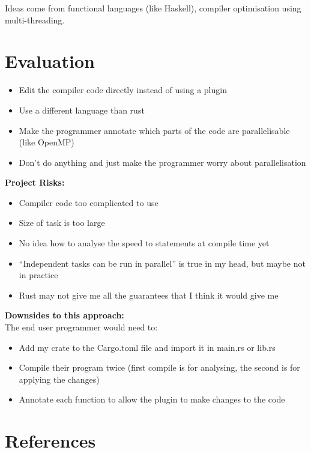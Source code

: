 \documentclass[12pt, a4paper]{article}
\begin{document}
Ideas come from functional languages (like Haskell), compiler optimisation using multi-threading.

\section{Evaluation}
\begin{itemize}
	\item Edit the compiler code directly instead of using a plugin
	\item Use a different language than rust
	\item Make the programmer annotate which parts of the code are parallelisable (like OpenMP)
	\item Don't do anything and just make the programmer worry about parallelisation
\end{itemize}

\textbf{Project Risks:}
\begin{itemize}
	\item Compiler code too complicated to use
	\item Size of task is too large
	\item No idea how to analyse the speed to statements at compile time yet
	\item ``Independent tasks can be run in parallel'' is true in my head, but maybe not in practice
	\item Rust may not give me all the guarantees that I think it would give me

\end{itemize}

\textbf{Downsides to this approach:}\\
The end user programmer would need to:
\begin{itemize}
	\item Add my crate to the Cargo.toml file and import it in main.rs or lib.rs
	\item Compile their program twice (first compile is for analysing, the second is for applying the changes)
	\item Annotate each function to allow the plugin to make changes to the code
\end{itemize}

\section{References}
\printbibliography[heading=none]
\end{document}
